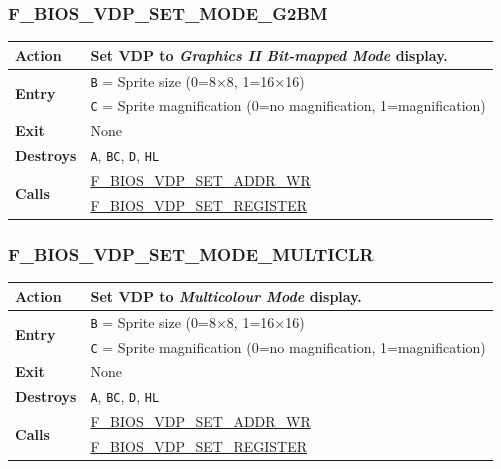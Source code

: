 \documentclass[a4paper,11pt]{article}
\begin{document}
        \subsubsection{F\_BIOS\_VDP\_SET\_MODE\_G2BM}
        \label{func:fbiosvdpsetmodeg2bm}
        \begin{tabular}{l p{9cm}}
            \hline\textbf{Action}
            & Set \textbf{VDP} to \textit{Graphics II Bit-mapped Mode} display.\\
            \hline\multirow[t]{2}{4em}{\textbf{Entry}}
            & \texttt{B} = Sprite size (0=8×8, 1=16×16)\\
            & \texttt{C} = Sprite magnification (0=no magnification,
                1=magnification)\\
            \hline\textbf{Exit} & None\\
            \hline\textbf{Destroys} & \texttt{A}, \texttt{BC}, \texttt{D},
            \texttt{HL} \\
            \hline\multirow[t]{2}{4em}{\textbf{Calls}}
            & \hyperref[func:fbiosvdpsetaddrwr]{F\_BIOS\_VDP\_SET\_ADDR\_WR}\\
            & \hyperref[func:fbiosvdpsetregister]{F\_BIOS\_VDP\_SET\_REGISTER}\\
            \hline
        \end{tabular}

        \subsubsection{F\_BIOS\_VDP\_SET\_MODE\_MULTICLR}
        \label{func:fbiosvdpsetmodemulticlr}
        \begin{tabular}{l p{9cm}}
            \hline\textbf{Action}
            & Set \textbf{VDP} to \textit{Multicolour Mode} display.\\
            \hline\multirow[t]{2}{4em}{\textbf{Entry}}
            & \texttt{B} = Sprite size (0=8×8, 1=16×16)\\
            & \texttt{C} = Sprite magnification (0=no magnification,
                1=magnification)\\
            \hline\textbf{Exit} & None\\
            \hline\textbf{Destroys} & \texttt{A}, \texttt{BC}, \texttt{D},
            \texttt{HL} \\
            \hline\multirow[t]{2}{4em}{\textbf{Calls}}
            & \hyperref[func:fbiosvdpsetaddrwr]{F\_BIOS\_VDP\_SET\_ADDR\_WR}\\
            & \hyperref[func:fbiosvdpsetregister]{F\_BIOS\_VDP\_SET\_REGISTER}\\
            \hline
        \end{tabular}
\end{document}
